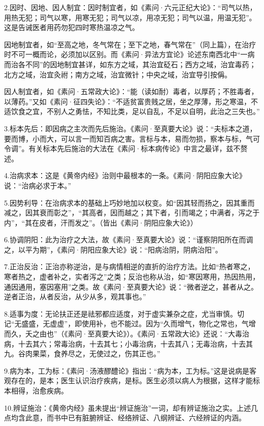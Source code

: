\documentclass[a4paper,12pt,UTF8,twoside]{ctexbook}
\begin{document}
2.因时、因地、因人制宜：因时制宜者，如《素问·六元正纪大论》：“司气以热，用热无犯；司气以寒，用寒无犯；司气以凉，用凉无犯；司气以温，用温无犯”。这是告诫医者用药勿犯四时寒热温凉之气。

因地制宜者，如“至高之地，冬气常在；至下之地，春气常在”（同上篇），在治疗时不可一概而论，必须加以区别。而《素问·异法方宜论》论述东南西北中“一病而治各不同”的因地制宜甚详，如东方之域，其治宜砭石；西方之域，治宜毒药；北方之域，治宜灸祔；南方之域，治宜微针；中央之域，治宜导引按偁。

因人制宜者，如《素问·五常政大论》：“能（读如耐）毒者，以厚药；不胜毒者，以薄药。”又如《素问·征四失论》：“不适贫富贵贱之居，坐之厚薄，形之寒温，不适饮食之宜，不别人之勇怯，不知比类，足以自乱，不足以自明，此治之三失也。”

3.标本先后：即因病之主次而先后施治。《素问·至真要大论》说：“夫标本之道，要而博，小而大，可以言一而知百病之害。言标与本，易而勿损，察本与标，气可令调”。有关标本先后施治的大法在《素问·标本病传论》中言之最详，兹不赘述。

4.治病求本：这是《黄帝内经》治则中最根本的一条。《素问·阴阳应象大论》说：“治病必求于本。”

5.因势利导：在治病求本的基础上巧妙地加以权变。如“因其轻而扬之，因其重而减之，因其衰而彰之”，“其高者，因而越之；其下者，引而竭之；中满者，泻之于内”，“其在皮者，汗而发之”。（皆出《素问·阴阳应象大论》）

6.协调阴阳：此为治疗之大法，故《素问·至真要大论》说：“谨察阴阳所在而调之，以平为期”，《素问·阴阳应象大论》说：“阳病治阴，阴病治阳”。

7.正治反治：正治亦称逆治，是与病情相逆的直折的治疗方法。比如“热者寒之，寒者热之，虚者补之，实者泻之”之类；反治也称从治，如“寒因寒用，热因热用，通因通用，塞因塞用”之类。故《素问·至真要大论》说：“微者逆之，甚者从之。逆者正治，从者反治，从少从多，观其事也。”

8.适事为度：无论扶正还是祛邪都应适度，对于虚实兼杂之症，尤当审慎。切记“无盛盛，无虚虚”，即使用补，也不能过。因为“久而增气，物化之常也，气增而久，夭之由也”（《素问·至真要大论》）。《素问·五常政大论》还说：“大毒治病，十去其六；常毒治病，十去其七；小毒治病，十去其八；无毒治病，十去其九。谷肉果菜，食养尽之，无使过之，伤其正也。”

9.病为本，工为标：《素问·汤液醪醴论》指出：“病为本，工为标。”这是说病是客观存在的，是本；医生认识治疗疾病，是标。医生必须以病人为根据，这样才能标本相得，治愈疾病。

10.辨证施治：《黄帝内经》虽未提出“辨证施治”一词，却有辨证施治之实。上述几点均含此意，而书中已有脏腑辨证、经络辨证、八纲辨证、六经辨证的内涵。
\end{document}
